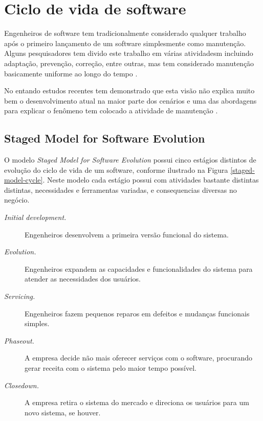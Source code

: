 \section{Ciclo de vida de software}

Engenheiros de software tem tradicionalmente considerado qualquer trabalho após
o primeiro lançamento de um software simplesmente como manutenção. Alguns
pesquisadores tem divido este trabalho em várias atividadesm incluindo
adaptação, prevenção, correção, entre outras, mas tem considerado manutenção
basicamente uniforme ao longo do tempo \cite{rajlich2000staged}.

No entando estudos recentes tem demonstrado que esta visão não explica muito
bem o desenvolvimento atual na maior parte dos cenários e uma das abordagens
para explicar o fenômeno tem colocado a atividade de manutenção \cite{rajlich2000staged}.

\subsection{Staged Model for Software Evolution}

O modelo {\it Staged Model for Software Evolution} \cite{rajlich2000staged}
possui cinco estágios distintos de evolução do ciclo de vida de um software,
conforme ilustrado na Figura \ref{staged-model-cycle}.  Neste modelo cada
estágio possui com atividades bastante distintas distintas, necessidades e
ferramentas variadas, e consequencias diversas no negócio.

\begin{description}
  \item [{\it Initial development.}]
    Engenheiros desenvolvem a primeira versão funcional do sistema.
  \item [{\it Evolution.}]
    Engenheiros expandem as capacidades e funcionalidades do sistema para
    atender as necessidades dos usuários.
  \item [{\it Servicing.}]
    Engenheiros fazem pequenos reparos em defeitos e mudanças funcionais
    simples.
  \item [{\it Phaseout.}]
    A empresa decide não mais oferecer serviços com o software, procurando
    gerar receita com o sistema pelo maior tempo possível.
  \item [{\it Closedown.}]
    A empresa retira o sistema do mercado e direciona os usuários para um novo
    sistema, se houver.
\end{description}


